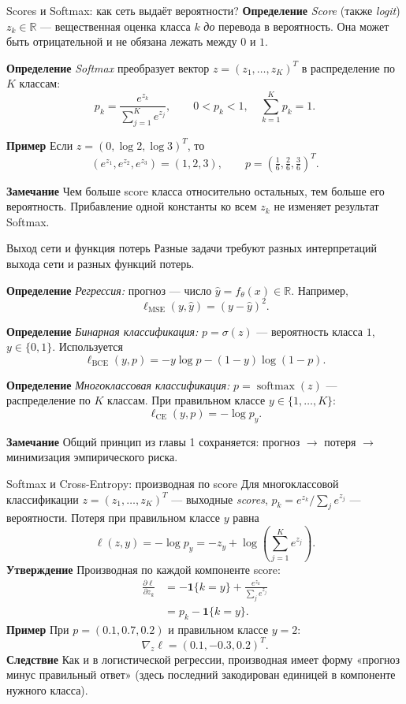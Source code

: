 \documentclass[10pt]{beamer}
\newcommand{\mlBody}{\normalsize}
\newcommand{\mlDefinition}{\textcolor{defblue}{\bfseries Определение}}
\newcommand{\mlStatement}{\textcolor{defblue}{\bfseries Утверждение}}
\newcommand{\mlRemark}{\textcolor{defblue}{\bfseries Замечание}}
\newcommand{\mlConsequence}{\textcolor{defblue}{\bfseries Следствие}}
\newcommand{\mlExample}{\textcolor{defblue}{\bfseries Пример}}
\begin{document}
\begin{frame}{Scores и Softmax: как сеть выдаёт вероятности?}
\mlBody
\mlDefinition\; \textit{Score} (также \textit{logit}) $z_k\in\mathbb R$
--- вещественная оценка класса $k$ \emph{до} перевода в вероятность.
Она может быть отрицательной и не обязана лежать между $0$ и $1$.

\mlDefinition\; \textit{Softmax} преобразует вектор
$z=(z_1,\ldots,z_K)^T$ в распределение по $K$ классам:
\[
 \boxed{p_k=\frac{e^{z_k}}{\sum_{j=1}^{K}e^{z_j}}},\qquad
 0<p_k<1,\quad\sum_{k=1}^{K}p_k=1.
\]

\mlExample\; Если $z=(0,\log 2,\log 3)^T$, то
\[
 (e^{z_1},e^{z_2},e^{z_3})=(1,2,3),\qquad
 p=\left(\tfrac16,\tfrac26,\tfrac36\right)^T.
\]

\mlRemark\; Чем больше score класса относительно остальных,
тем больше его вероятность. Прибавление одной константы
ко всем $z_k$ не изменяет результат Softmax.
\end{frame}

\begin{frame}{Выход сети и функция потерь}
\mlBody
Разные задачи требуют разных интерпретаций выхода сети
и разных функций потерь.

\mlDefinition\; \textit{Регрессия:} прогноз --- число
$\hat y=f_\theta(x)\in\mathbb R$. Например,
\[
 \boxed{\ell_{\mathrm{MSE}}(y,\hat y)=(y-\hat y)^2}.
\]

\mlDefinition\; \textit{Бинарная классификация:}
$p=\sigma(z)$ --- вероятность класса $1$,
$y\in\{0,1\}$. Используется
\[
 \boxed{\ell_{\mathrm{BCE}}(y,p)=
 -y\log p-(1-y)\log(1-p)}.
\]

\mlDefinition\; \textit{Многоклассовая классификация:}
$p=\operatorname{softmax}(z)$ --- распределение по $K$ классам.
При правильном классе $y\in\{1,\ldots,K\}$:
\[
 \boxed{\ell_{\mathrm{CE}}(y,p)=-\log p_y}.
\]

\mlRemark\; Общий принцип из главы 1 сохраняется:
прогноз $\to$ потеря $\to$ минимизация эмпирического риска.
\end{frame}

\begin{frame}{Softmax и Cross-Entropy: производная по score}
\mlBody
Для многоклассовой классификации $z=(z_1,\ldots,z_K)^T$ ---
выходные \textit{scores}, $p_k=e^{z_k}/\sum_j e^{z_j}$ --- вероятности.
Потеря при правильном классе $y$ равна
\[
  \ell(z,y)=-\log p_y=-z_y+\log\!\left(\sum_{j=1}^{K}e^{z_j}\right).
\]
\mlStatement\; Производная по каждой компоненте score:
\[
\begin{aligned}
 \frac{\partial\ell}{\partial z_k}
 &= -\mathbf 1\{k=y\}
 +\frac{e^{z_k}}{\sum_j e^{z_j}}\\
 &=\boxed{p_k-\mathbf 1\{k=y\}}.
\end{aligned}
\]
\mlExample\; При $p=(0.1,0.7,0.2)$ и правильном классе $y=2$:
\[
 \nabla_z\ell=(0.1,-0.3,0.2)^T.
\]
\mlConsequence\; Как и в логистической регрессии, производная имеет
форму «прогноз минус правильный ответ» (здесь последний закодирован
единицей в компоненте нужного класса).
\end{frame}
\end{document}
